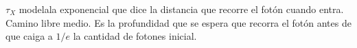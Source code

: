 


$\tau_{X}$ modelala exponencial que dice la distancia que recorre el fotón cuando entra. Camino libre medio. Es la profundidad que se espera que recorra el fotón antes de que caiga a $1/e$ la cantidad de fotones inicial.